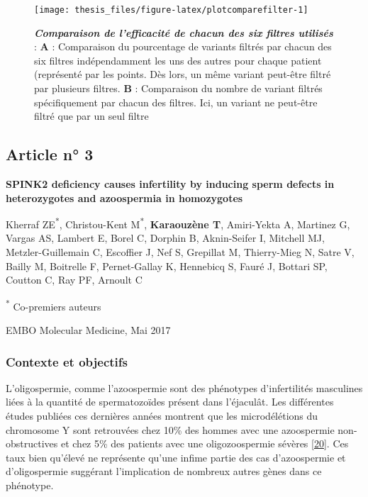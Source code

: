 \documentclass[12pt,twoside]{ugathesis}
\begin{document}
\newpage

\begin{figure}

{\centering \texttt{[image: thesis\_files/figure-latex/plotcomparefilter-1]} 

}

\caption[Comparaison de l'efficacité de chacun des six filtres utilisés]{\textbf{\emph{Comparaison de l'efficacité de
chacun des six filtres utilisés}} : \textbf{A} : Comparaison du
pourcentage de variants filtrés par chacun des six filtres
indépendamment les uns des autres pour chaque patient (représenté par
les points. Dès lors, un même variant peut-être filtré par plusieurs
filtres. \textbf{B} : Comparaison du nombre de variant filtrés
spécifiquement par chacun des filtres. Ici, un variant ne peut-être
filtré que par un seul filtre}\label{fig:plotcomparefilter}
\end{figure}










\newpage

\newpage  

\subsection{Article n° 3}\label{article-n-3}

\textbf{SPINK2 deficiency causes infertility by inducing sperm defects
in heterozygotes and azoospermia in homozygotes}

Kherraf ZE\textsuperscript{*}, Christou-Kent M\textsuperscript{*},
\textbf{Karaouzène T}, Amiri-Yekta A, Martinez G, Vargas AS, Lambert E,
Borel C, Dorphin B, Aknin-Seifer I, Mitchell MJ, Metzler-Guillemain C,
Escoffier J, Nef S, Grepillat M, Thierry-Mieg N, Satre V, Bailly M,
Boitrelle F, Pernet-Gallay K, Hennebicq S, Fauré J, Bottari SP, Coutton
C, Ray PF, Arnoult C

\textsuperscript{*} Co-premiers auteurs

EMBO Molecular Medicine, Mai 2017

\newpage

\subsubsection{Contexte et objectifs}\label{contexte-et-objectifs}

L'oligospermie, comme l'azoospermie sont des phénotypes d'infertilités
masculines liées à la quantité de spermatozoïdes présent dans
l'éjaculât. Les différentes études publiées ces dernières années
montrent que les microdélétions du chromosome Y sont retrouvées chez
10\% des hommes avec une azoospermie non-obstructives et chez 5\% des
patients avec une oligozoospermie sévères
{[}\protect\hyperlink{ref-Hotaling2014}{20}{]}. Ces taux bien qu'élevé
ne représente qu'une infime partie des cas d'azoospermie et
d'oligospermie suggérant l'implication de nombreux autres gènes dans ce
phénotype.
\end{document}

